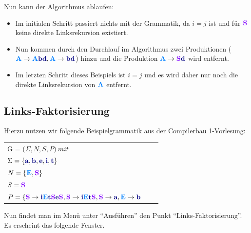 Nun kann der Algorithmus ablaufen:

\begin{itemize}
  \item Im initialen Schritt passiert nichts mit der Grammatik, da $i = j$ ist und für $\StartSymbol{S}$ keine direkte Linksrekursion existiert.
  \item Nun kommen durch den Durchlauf im Algorithmus zwei Produktionen ($\NonterminalSymbol{A} \to \NonterminalSymbol{A}\TerminalSymbol{b}\TerminalSymbol{d},\NonterminalSymbol{A} \to \TerminalSymbol{b}\TerminalSymbol{d}$) hinzu und die Produktion $\NonterminalSymbol{A} \to \StartSymbol{S}\TerminalSymbol{d}$ wird entfernt.
  \item Im letzten Schritt dieses Beispiels ist $i = j$ und es wird daher nur noch die direkte Linksrekursion von $\NonterminalSymbol{A}$ entfernt.
\end{itemize}

\subsection{Links-Faktorisierung}

Hierzu nutzen wir folgende Beispielgrammatik aus der Compilerbau 1-Vorlesung:

\begin{tabular}{lcr}
G = ($\Sigma, N, S, P )\ mit $\\
$\Sigma = \{\TerminalSymbol{a}, \TerminalSymbol{b}, \TerminalSymbol{e},
\TerminalSymbol{i},\TerminalSymbol{t}\}$\\ $N =
\{\NonterminalSymbol{E}, \StartSymbol{S}\}$\\ $S=\StartSymbol{S}$\\
$P = \{\StartSymbol{S} \to \TerminalSymbol{i}\NonterminalSymbol{E}\TerminalSymbol{t}\StartSymbol{S}\TerminalSymbol{e}\StartSymbol{S},\StartSymbol{S} \to \TerminalSymbol{i}\NonterminalSymbol{E}\TerminalSymbol{t}\StartSymbol{S}, \StartSymbol{S} \to \TerminalSymbol{a}, \NonterminalSymbol{E} \to \TerminalSymbol{b}$\\
\end{tabular}

Nun findet man im Menü unter "`Ausführen"' den Punkt "`Links-Faktorisierung"'. Es erscheint das folgende Fenster.

